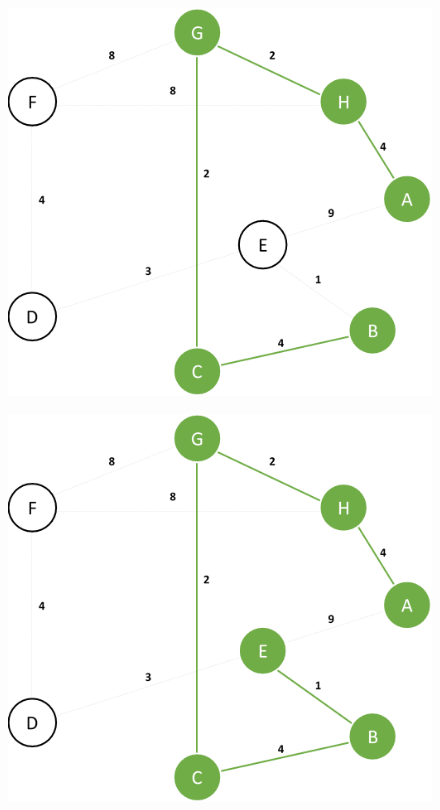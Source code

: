 \documentclass{article}
\begin{document}
\begin{figure}[H]
\centering
\includegraphics[scale=0.6]{images/Q2/05.png}
\end{figure}

\begin{figure}[H]
\centering
\includegraphics[scale=0.6]{images/Q2/06.png}
\end{figure}
\end{document}
